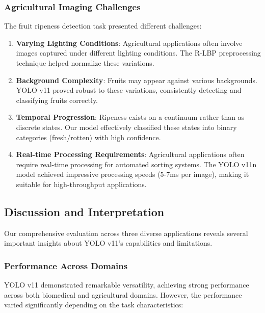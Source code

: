 \begin{multicols}{2}
\subsubsection{Agricultural Imaging Challenges}

The fruit ripeness detection task presented different challenges:

\begin{enumerate}
    \item \textbf{Varying Lighting Conditions}: Agricultural applications often involve images captured under different lighting conditions. The R-LBP preprocessing technique helped normalize these variations.
    
    \item \textbf{Background Complexity}: Fruits may appear against various backgrounds. YOLO v11 proved robust to these variations, consistently detecting and classifying fruits correctly.
    
    \item \textbf{Temporal Progression}: Ripeness exists on a continuum rather than as discrete states. Our model effectively classified these states into binary categories (fresh/rotten) with high confidence.
    
    \item \textbf{Real-time Processing Requirements}: Agricultural applications often require real-time processing for automated sorting systems. The YOLO v11n model achieved impressive processing speeds (5-7ms per image), making it suitable for high-throughput applications.
\end{enumerate}

\subsection{Discussion and Interpretation}

Our comprehensive evaluation across three diverse applications reveals several important insights about YOLO v11's capabilities and limitations.

\subsubsection{Performance Across Domains}

YOLO v11 demonstrated remarkable versatility, achieving strong performance across both biomedical and agricultural domains. However, the performance varied significantly depending on the task characteristics:


\end{multicols}

